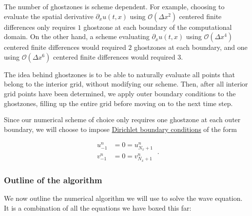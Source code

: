 \documentclass[a4paper,11pt]{article}
\begin{document}
The number of ghostzones is scheme dependent. For example, choosing to evaluate the spatial derivative $\partial_{x}u(t,x)$ using $\mathcal{O}\left(\Delta x^{2}\right)$ centered finite differences only requires $1$ ghostzone at each boundary of the computational domain. On the other hand, a scheme evaluating $\partial_{x}u(t,x)$ using $\mathcal{O}\left(\Delta x^{4}\right)$ centered finite differences would required $2$ ghostzones at each boundary, and one using $\mathcal{O}\left(\Delta x^{6}\right)$ centered finite differences would required $3$.

The idea behind ghostzones is to be able to naturally evaluate all points that belong to the interior grid, without modifying our scheme. Then, after all interior grid points have been determined, we apply outer boundary conditions to the ghostzones, filling up the entire grid before moving on to the next time step.

Since our numerical scheme of choice only requires one ghostzone at each outer boundary, we will choose to impose \href{https://en.wikipedia.org/wiki/Dirichlet_boundary_condition}{Dirichlet boundary conditions} of the form

\begin{equation}
\boxed{
\begin{aligned}
u^{n}_{-1} &= 0 = u^{n}_{N_{x}+1}\\
v^{n}_{-1} &= 0 = v^{n}_{N_{x}+1}
\end{aligned}
}\ .
\end{equation}

\subsubsection{Outline of the algorithm}

We now outline the numerical algorithm we will use to solve the wave equation. It is a combination of all the equations we have boxed this far:
\end{document}

